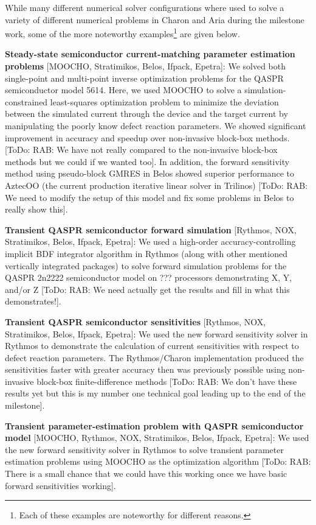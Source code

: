 \documentclass[pdf,ps2pdf,11pt]{SANDreport}
\begin{document}
While many different numerical solver configurations where used to solve a
variety of different numerical problems in Charon and Aria during the
milestone work, some of the more noteworthy examples\footnote{Each of these
examples are noteworthy for different reasons.} are given below.

{}\noindent\textbf{Steady-state semiconductor current-matching parameter
estimation problems} [MOOCHO, Stratimikos, Belos, Ifpack, Epetra]: We solved
both single-point and multi-point inverse optimization problems for the QASPR
semiconductor model 5614.  Here, we used MOOCHO to solve a
simulation-constrained least-squares optimization problem to minimize the
deviation between the simulated current through the device and the target
current by manipulating the poorly know defect reaction parameters.  We showed
significant improvement in accuracy and speedup over non-invasive block-box
methods. [ToDo: RAB: We have not really compared to the non-invasive block-box
methods but we could if we wanted too].  In addition, the forward sensitivity
method using pseudo-block GMRES in Belos showed superior performance to
AztecOO (the current production iterative linear solver in Trilinos) [ToDo:
RAB: We need to modify the setup of this model and fix some problems in Belos
to really show this].

{}\noindent\textbf{Transient QASPR semiconductor forward simulation} [Rythmos,
NOX, Stratimikos, Belos, Ifpack, Epetra]: We used a high-order
accuracy-controlling implicit BDF integrator algorithm in Rythmos (along with
other mentioned vertically integrated packages) to solve forward simulation
problems for the QASPR 2n2222 semiconductor model on ??? processors
demonstrating X, Y, and/or Z [ToDo: RAB: We need actually get the results and
fill in what this demonstrates!].
 
{}\noindent\textbf{Transient QASPR semiconductor sensitivities} [Rythmos, NOX,
Stratimikos, Belos, Ifpack, Epetra]: We used the new forward sensitivity
solver in Rythmos to demonstrate the calculation of current sensitivities with
respect to defect reaction parameters.  The Rythmos/Charon implementation
produced the sensitivities faster with greater accuracy then was previously
possible using non-invasive block-box finite-difference methods [ToDo: RAB: We
don't have these results yet but this is my number one technical goal leading
up to the end of the milestone].
 
{}\noindent\textbf{Transient parameter-estimation problem with QASPR
semiconductor model} [MOOCHO, Rythmos, NOX, Stratimikos, Belos, Ifpack,
Epetra]: We used the new forward sensitivity solver in Rythmos to solve
transient parameter estimation problems using MOOCHO as the optimization
algorithm [ToDo: RAB: There is a small chance that we could have this working
once we have basic forward sensitivities working].
\end{document}
